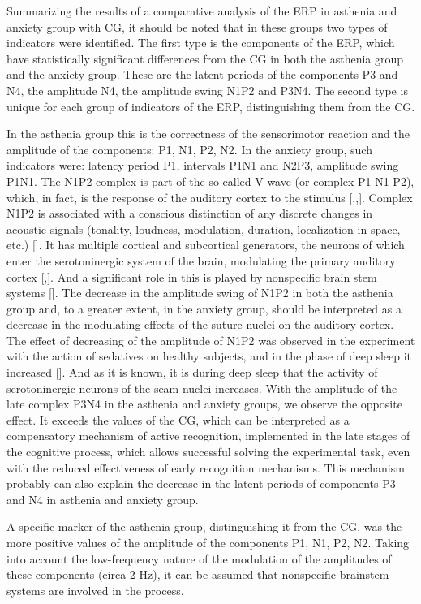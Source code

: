 \documentclass[twocolumn]{article}
\begin{document}
\par Summarizing the results of a comparative analysis of the ERP in asthenia and anxiety group with CG, it should be noted that in these groups two types of indicators were identified. The first type is the components of the ERP, which have statistically significant differences from the CG in both the asthenia group and the anxiety group. These are the latent periods of the components P3 and N4, the amplitude N4, the amplitude swing N1P2 and P3N4. The second type is unique for each group of indicators of the ERP, distinguishing them from the CG.
\par In the asthenia group this is the correctness of the sensorimotor reaction and the amplitude of the components: P1, N1, P2, N2. In the anxiety group, such indicators were: latency period P1, intervals P1N1 and N2P3, amplitude swing P1N1. The N1P2 complex is part of the so-called V-wave (or complex P1-N1-P2), which, in fact, is the response of the auditory cortex to the stimulus [\cite{bib28},\cite{bib29},\cite{bib30}]. Complex N1P2 is associated with a conscious distinction of any discrete changes in acoustic signals (tonality, loudness, modulation, duration, localization in space, etc.) [\cite{bib31}]. It has multiple cortical and subcortical generators, the neurons of which enter the serotoninergic system of the brain, modulating the primary auditory cortex [\cite{bib32},\cite{bib33}]. And a significant role in this is played by nonspecific brain stem systems [\cite{bib34}]. The decrease in the amplitude swing of N1P2 in both the asthenia group and, to a greater extent, in the anxiety group, should be interpreted as a decrease in the modulating effects of the suture nuclei on the auditory cortex. The effect of decreasing of the amplitude of N1P2 was observed in the experiment with the action of sedatives on healthy subjects, and in the phase of deep sleep it increased [\cite{bib35}]. And as it is known, it is during deep sleep that the activity of serotoninergic neurons of the seam nuclei increases. With the amplitude of the late complex P3N4 in the asthenia and anxiety groups, we observe the opposite effect. It exceeds the values of the CG, which can be interpreted as a compensatory mechanism of active recognition, implemented in the late stages of the cognitive process, which allows successful solving the experimental task, even with the reduced effectiveness of early recognition mechanisms. This mechanism probably can also explain the decrease in the latent periods of components P3 and N4 in asthenia and anxiety group.
\par A specific marker of the asthenia group, distinguishing it from the CG, was the more positive values of the amplitude of the components P1, N1, P2, N2. Taking into account the low-frequency nature of the modulation of the amplitudes of these components (circa 2 Hz), it can be assumed that nonspecific brainstem systems are involved in the process.
\end{document}
